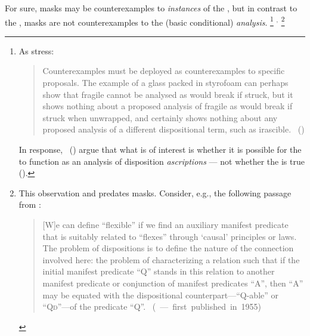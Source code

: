 \begin{note}
  For sure, masks may be counterexamples to \emph{instances} of the \dBCAa{}, but in contrast to the \dSCAa{}, masks are not counterexamples to the (basic conditional) \emph{analysis}.%
  \footnote{
    As \citeauthor{Bonevac:2011tz} stress:
    \begin{quote}
      Counterexamples must be deployed as counterexamples to specific proposals.
      The example of a glass packed in styrofoam can perhaps show that fragile cannot be analysed as would break if struck, but it shows nothing about a proposed analysis of fragile as would break if struck when unwrapped, and certainly shows nothing about any proposed analysis of a different dispositional term, such as irascible.%
      \mbox{ }\hfill\mbox{(\citeyear[1144]{Bonevac:2011tz})}
    \end{quote}
    \nocite{Manley:2007aa}
    In response,~\citeauthor{Manley:2011aa} (\citeyear{Manley:2011aa}) argue that what is of interest is whether it is possible for the  to function as an analysis of disposition \emph{ascriptions} --- not whether the  is true (\citeyear[cf.][\S1.3]{Manley:2011aa}).
  }%
  \(^{,}\)%
  \footnote{
    This observation and predates masks.
    Consider, e.g., the following passage from \citeauthor{Goodman:1983aa}:

    \begin{quote}
      [W]e can define ``flexible'' if we find an auxiliary manifest predicate that is suitably related to ``flexes'' through `causal' principles or laws.
      The problem of dispositions is to define the nature of the connection involved here:
      the problem of characterizing a relation such that if the initial manifest predicate ``Q'' stands in this relation to another manifest predicate or conjunction of manifest predicates ``A'', then ``A'' may be equated with the dispositional counterpart---``Q-able'' or ``Q\textsc{d}''---of the predicate ``Q''.\nolinebreak
      \mbox{ }\hfill\mbox{(\citeyear[45]{Goodman:1983aa} --- first published in 1955)}
    \end{quote}
  }
\end{note}


